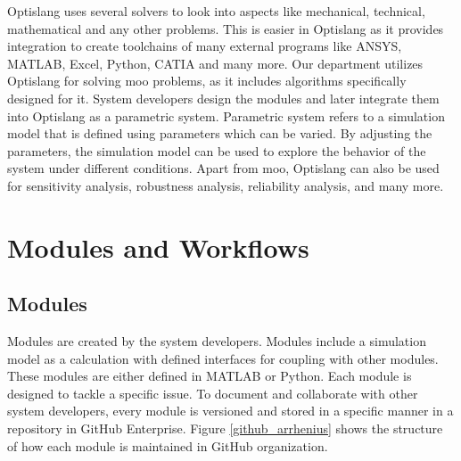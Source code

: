 Optislang uses several solvers to look into aspects like mechanical, technical, mathematical and any other problems. This is easier in Optislang as it provides
integration to create toolchains of many external programs like ANSYS, MATLAB, Excel, Python, CATIA and many more. Our department utilizes Optislang for solving 
\acrshort{moo} problems, as it includes algorithms specifically designed for it. System developers design the modules and later integrate them into Optislang 
as a parametric system. Parametric system refers to a simulation model that is defined using parameters which can be varied. By adjusting the parameters, the 
simulation model can be used to explore the behavior of the system under different conditions. Apart from \acrshort{moo}, Optislang can also be used for 
sensitivity analysis, robustness analysis, reliability analysis, and many more. 
\section{Modules and Workflows}
\subsection{Modules}
Modules are created by the system developers. Modules include a simulation model as a calculation with defined interfaces for coupling with other modules. 
These modules are either defined in MATLAB or Python. Each module is designed to tackle a specific issue. To document and collaborate with other
system developers, every module is versioned and stored in a specific manner in a repository in GitHub Enterprise. Figure \ref{github_arrhenius} shows the 
structure of how each module is maintained in GitHub organization.

